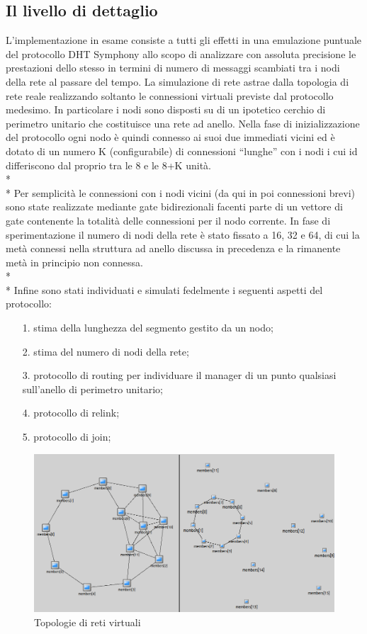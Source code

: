 \documentclass[	
	DIV=calc,
	paper=a4,
	fontsize=11pt,
	onecolumn
]{scrartcl} %
\begin{document}
	\subsection{Il livello di dettaglio}
	L'implementazione in esame consiste a tutti gli effetti in una emulazione puntuale del protocollo DHT Symphony allo scopo di analizzare con assoluta precisione le prestazioni dello stesso in termini di numero di messaggi scambiati tra i nodi della rete al passare del tempo. La simulazione di rete astrae dalla topologia di rete reale realizzando soltanto le connessioni virtuali previste dal protocollo medesimo. In particolare i nodi sono disposti su di un ipotetico cerchio di perimetro unitario che costituisce una rete ad anello. Nella fase di inizializzazione del protocollo ogni nodo è quindi connesso ai suoi due immediati vicini ed è dotato di un numero K (configurabile) di connessioni ``lunghe'' con i nodi i cui id differiscono dal proprio tra le 8 e le 8+K unità. \\*\\*
Per semplicità le connessioni con i nodi vicini (da qui in poi connessioni brevi) sono state realizzate mediante gate bidirezionali facenti parte di un vettore di gate contenente la totalità delle connessioni per il nodo corrente. In fase di sperimentazione il numero di nodi della rete è stato fissato a 16, 32 e 64, di cui la metà connessi nella struttura ad anello discussa in precedenza e la rimanente metà in principio non connessa.\\*\\* 
Infine sono stati individuati e simulati fedelmente i seguenti aspetti del protocollo:
	\begin{itemize}
		\item[1.] stima della lunghezza del segmento gestito da un nodo;
		\item[2.] stima del numero di nodi della rete;
		\item[3.] protocollo di routing per individuare il manager di un punto qualsiasi sull'anello di perimetro unitario;
		\item[4.] protocollo di relink;
		\item[5.] protocollo di join;
	\end{itemize}

\begin{figure}[H]
	\centering
	\includegraphics[scale=0.35]{topologia.png}
	\caption{Topologie di reti virtuali}
	\label{Figura 1}
\end{figure}
\end{document}
